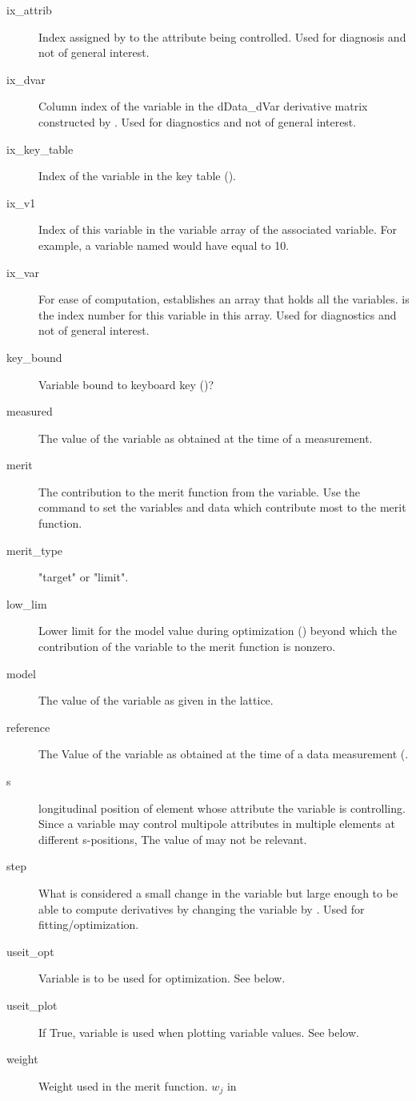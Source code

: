 \begin{description}
  \item[ix_attrib] \Newline
Index assigned by \bmad to the attribute being controlled. Used for diagnosis and not
of general interest.
  \item[ix_dvar] \Newline
Column index of the variable in the dData_dVar derivative matrix constructed by \tao.
Used for diagnostics and not of general interest.
  \item[ix_key_table] \Newline
Index of the variable in the key table ().
  \item[ix_v1] \Newline
Index of this variable in the variable array of the associated  variable.
For example, a variable named  would have  equal to 10.
  \item[ix_var] \Newline
For ease of computation, \tao establishes an array that holds all the variables.
 is the index number for this variable in this array. 
Used for diagnostics and not of general interest.
  \item[key_bound] \Newline
Variable bound to keyboard key ()?
  \item[measured] \Newline
The value of the variable as obtained at the time of a  measurement.
  \item[merit] \Newline
The contribution to the merit function  from the variable. Use the 
command to set the variables and data which contribute most to the merit function.
  \item[merit_type] \Newline
"target" or "limit".
  \item[low_lim] \Newline
Lower limit for the model value during optimization () beyond which
the contribution of the variable to the merit function is nonzero.
  \item[model] \Newline
The value of the variable as given in the  lattice.
  \item[reference] \Newline
The Value of the variable as obtained at the time of a  data measurement
(.
  \item[s] \Newline
longitudinal position of element whose attribute the variable is controlling.  Since a
variable may control multipole attributes in multiple elements at different s-positions,
The value of  may not be relevant.
  \item[step] \Newline
What is considered a small change in the variable but large enough to be able to compute
derivatives by changing the variable by . Used for fitting/optimization.  
  \item[useit_opt] \Newline
Variable is to be used for optimization. See below.
  \item[useit_plot] \Newline
If True, variable is used when plotting variable values. See below.
  \item[weight] \Newline
Weight used in the merit function. $w_j$ in 
  \end{description}


